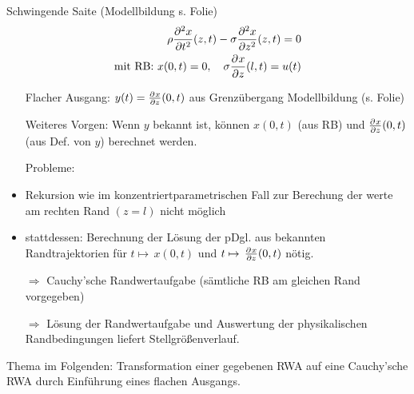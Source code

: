 \begin{bsp}Schwingende Saite (Modellbildung s. Folie)
\begin{align*}
\rho\pd[2]{x}{t^2}(z,t)-\sigma\pd[2]{x}{z^2}(z,t) = 0 \\
\textrm{mit RB: } x(0,t) = 0, \quad \sigma \pd{x}{z}(l,t)=u(t)
\end{align*}
\begin{itemize}
\item[] Flacher Ausgang: $y(t) = \pd{x}{z}(0,t)$ aus Grenzübergang Modellbildung (s. Folie)

\item[] Weiteres Vorgen: Wenn $y$ bekannt ist, können $x(0,t)$ (aus RB) und $\pd{x}{z}(0,t)$ (aus Def. von $y$) berechnet werden.

\item[] Probleme:

\item Rekursion wie im konzentriertparametrischen Fall zur Berechung der werte am rechten Rand $(z=l)$ nicht möglich
\item stattdessen: Berechnung der Lösung der pDgl. aus bekannten Randtrajektorien für $t\mapsto\,x(0,t)$ und $t\mapsto\,\pd{x}{z}(0,t)$ nötig.
\item[$\Rightarrow$] Cauchy'sche Randwertaufgabe (sämtliche RB am gleichen Rand vorgegeben)
\item [$\Rightarrow$] Lösung der Randwertaufgabe und Auswertung der physikalischen Randbedingungen liefert Stellgrößenverlauf.
\end{itemize}
\end{bsp}
Thema im Folgenden: Transformation einer gegebenen RWA auf eine Cauchy'sche RWA durch Einführung eines flachen Ausgangs.

